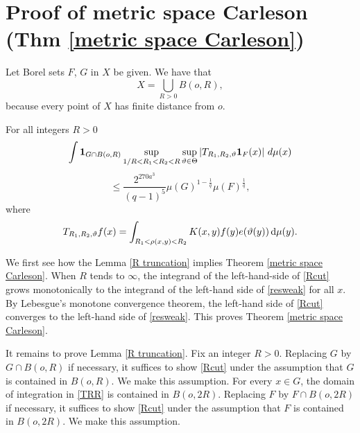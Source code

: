 \section{Proof of metric space Carleson (Thm \ref{metric space Carleson})}
\label{thmfromproplinear}


Let Borel sets $F$, $G$ in $X$ be given.
We have that
\begin{equation}
    X=\bigcup_{R>0}B(o,R),
\end{equation} because every point of $X$
has finite distance from $o$.
\begin{lemma}\label{R truncation}
For all integers $R>0$
$$
    \int \mathbf{1}_{G\cap B(o,R)}
    \sup_{1/R<R_1<R_2<R}\sup_{\vartheta\in\Theta}
    \left| T_{R_1,R_2,\vartheta} \mathbf{1}_{F}(x) \right|\, d\mu(x)
$$
\begin{equation} \label{Rcut}
    \leq \frac{2^{270a^3}}{(q-1)^5} \mu(G)^{1-\frac{1}{q}} \mu(F)^{\frac{1}{q}},
\end{equation}
where
\begin{equation}\label{TRR}
    T_{R_1,R_2,\vartheta} f(x)=
    \int_{R_1 <  \rho(x,y) < R_2}  K(x,y) f(y) e(\vartheta(y)) \, \mathrm{d}\mu(y) .
\end{equation}
\end{lemma}

We first see how the Lemma \ref{R truncation} implies
Theorem \ref{metric space Carleson}. When $R$ tends to $\infty$, the integrand of the left-hand-side of \eqref{Rcut}
grows monotonically to the integrand of the
left-hand side of \eqref{resweak} for all $x$.
By Lebesgue's monotone convergence theorem, the left-hand side of \eqref{Rcut} converges to the
left-hand side of \eqref{resweak}. This proves Theorem \ref{metric space Carleson}.

It remains to prove Lemma \ref{R truncation}.
Fix an integer $R>0$.  Replacing
$G$ by $G\cap B(o,R)$ if necessary, it suffices to show
\eqref{Rcut} under the assumption that $G$ is contained in $B(o,R)$. We make this assumption.
For every $x\in G$, the domain of integration
in \eqref{TRR} is contained in $B(o,2R)$.
Replacing
$F$ by $F\cap B(o,2R)$ if necessary, it suffices to show
\eqref{Rcut} under the assumption that $F$ is contained in $B(o,2R)$. We make this assumption.

